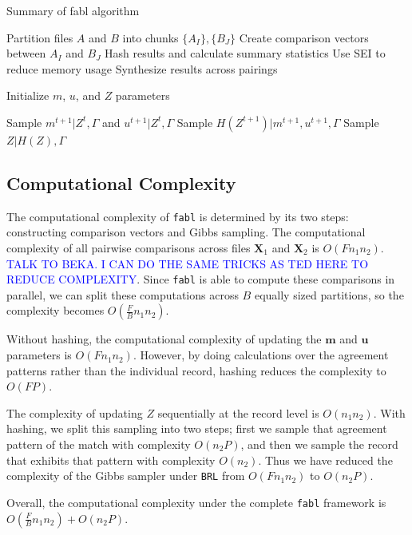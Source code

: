 \documentclass[12pt,letterpaper]{article}
\newcommand{\1}[1]{\mathbb{I}\!\left[#1\right]} %
\begin{document}
\begin{algorithm}[h!]
	\caption{Summary of fabl algorithm}
	\begin{algorithmic}[1]
		
		\State Partition files $A$ and $B$ into chunks $\{A_I\}, \{B_J\}$
		\State Create comparison vectors between $A_I$ and $B_J$
		\State Hash results and calculate summary statistics
		\State Use SEI to reduce memory usage
		\EndFor
		\State Synthesize results across pairings
		\EndProcedure
		
		\State Initialize $m$, $u$, and $Z$ parameters
		
		\State Sample $m^{t+1}|Z^{t}, \Gamma$ and  $u^{t+1}|Z^{t}, \Gamma$ 
		\State Sample $H\left(Z^{t+1}\right)|m^{t+1}, u^{t+1}, \Gamma$  
		\EndFor
		\State Sample $Z | H(Z), \Gamma$ 

		\EndProcedure
		
	\end{algorithmic}
\end{algorithm}

\hypertarget{computational-complexity}{%
	\subsection{Computational Complexity}\label{computational-complexity}}

{
\color{blue}
The computational complexity of \texttt{fabl} is determined by its two steps: constructing comparison vectors and Gibbs sampling. The computational complexity of all pairwise comparisons across files $\mathbf{X}_1$ and $\mathbf{X}_2$ is $O(F n_1 n_2)$. \textcolor{blue}{TALK TO BEKA. I CAN DO THE SAME TRICKS AS TED HERE TO REDUCE COMPLEXITY}. Since \texttt{fabl} is able to compute these comparisons in parallel, we can split these computations across $B$ equally sized partitions, so the complexity becomes $O(\frac{F}{B} n_1 n_2)$.

Without hashing, the computational complexity of updating the $\mathbf{m}$ and $\mathbf{u}$ parameters is $O(F n_1 n_2)$. However, by doing calculations over the agreement patterns rather than the individual record, hashing reduces the complexity to $O(FP)$.

The complexity of updating $Z$ sequentially at the record level is $O(n_1 n_2)$. With hashing, we split this sampling into two steps; first we sample that agreement pattern of the match with complexity $O(n_2 P)$, and then we sample the record that exhibits that pattern with complexity $O(n_2)$. Thus we have reduced the complexity of the Gibbs sampler under \texttt{BRL} from $O(F n_1 n_2)$ to $O(n_2 P)$.

Overall, the computational complexity under the complete \texttt{fabl} framework is $O(\frac{F}{B} n_1 n_2) + O(n_2 P)$.
}
\end{document}
